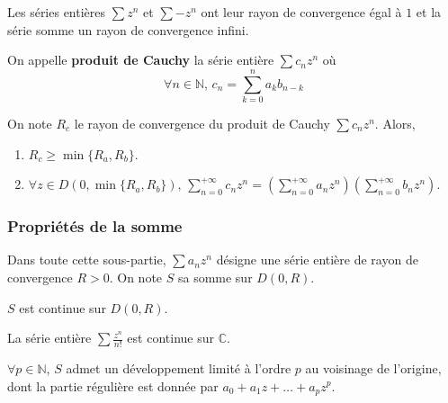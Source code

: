 
	\begin{example}
		Les séries entières $\sum z^n$ et $\sum -z^n$ ont leur rayon de convergence égal à $1$ et la série somme un rayon de convergence infini.
	\end{example}


	\begin{definition}
		On appelle \textbf{produit de Cauchy} la série entière $\sum c_n z^n$ où
		\[ \forall n \in \mathbb{N}, \, c_n = \sum_{k=0}^n a_k b_{n-k} \]
	\end{definition}

	\begin{proposition}
		On note $R_{c}$ le rayon de convergence du produit de Cauchy $\sum c_n z^n$. Alors,
		\begin{enumerate}[label=(\roman*)]
			\item $R_c \geq \min \{R_a, R_b\}$.
			\item $\forall z \in D(0, \min \{R_a, R_b\}), \, \sum_{n = 0}^{+\infty} c_n z^n = (\sum_{n = 0}^{+\infty} a_n z^n) (\sum_{n = 0}^{+\infty} b_n z^n)$.
		\end{enumerate}
	\end{proposition}

	\subsubsection{Propriétés de la somme}

	\reference[AMR11]{239}

	Dans toute cette sous-partie, $\sum a_n z^n$ désigne une série entière de rayon de convergence $R > 0$. On note $S$ sa somme sur $D(0,R)$.

	\begin{proposition}
		$S$ est continue sur $D(0,R)$.
	\end{proposition}

	\begin{example}
		La série entière $\sum \frac{z^n}{n!}$ est continue sur $\mathbb{C}$.
	\end{example}

	\begin{corollary}
		$\forall p \in \mathbb{N}$, $S$ admet un développement limité à l'ordre $p$ au voisinage de l'origine, dont la partie régulière est donnée par $a_0 + a_1z + \dots + a_pz^p$.
	\end{corollary}


